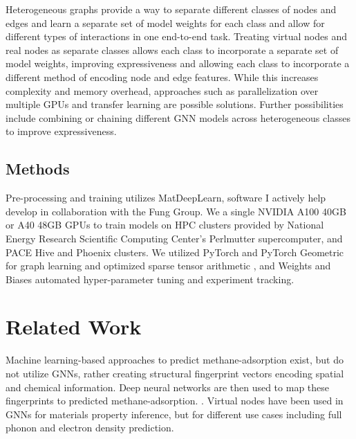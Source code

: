 \documentclass{lxaiproposal}
\begin{document}
Heterogeneous graphs provide a way to separate different classes of nodes and edges and learn a separate set of model weights for each class and allow for different types of interactions in one end-to-end task. Treating virtual nodes and real nodes as separate classes allows each class to incorporate a separate set of model weights, improving expressiveness and allowing each class to incorporate a different method of encoding node and edge features. While this increases complexity and memory overhead, approaches such as parallelization over multiple GPUs and transfer learning are possible solutions. Further possibilities include combining or chaining different GNN models across heterogeneous classes to improve expressiveness.

\subsection*{Methods}

Pre-processing and training utilizes MatDeepLearn\cite{fung2021benchmarking}, software I actively help develop in collaboration with the Fung Group. We a single NVIDIA A100 40GB or A40 48GB GPUs to train models on HPC clusters provided by National Energy Research Scientific Computing Center's Perlmutter supercomputer, and PACE Hive and Phoenix clusters\cite{PACE}. We utilized PyTorch\cite{pytorch} and PyTorch Geometric for graph learning and optimized sparse tensor arithmetic \cite{Fey2019FastGR}, and Weights and Biases\cite{wandb} automated hyper-parameter tuning and experiment tracking.

\section*{Related Work}

Machine learning-based approaches to predict methane-adsorption exist, but do not utilize GNNs, rather creating structural fingerprint vectors encoding spatial and chemical information. Deep neural networks are then used to map these fingerprints to predicted methane-adsorption. \cite{gurnani2021interpretable}. 
Virtual nodes have been used in GNNs for materials property inference, but for different use cases including full phonon\cite{https://doi.org/10.48550/arxiv.2010.09435} and electron density prediction\cite{jorgensen2022equivariant}.
\end{document}
